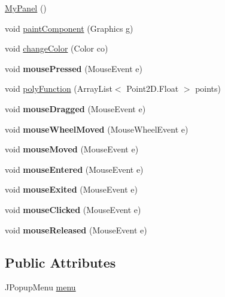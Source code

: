 \begin{DoxyCompactItemize}
\item 
\hyperlink{class_my_panel_a9395d78dbd3ccb9159bcdfd8fa54bf62}{My\+Panel} ()
\item 
void \hyperlink{class_my_panel_a01d8184b14a097e845b1845ddf3e4d7d}{paint\+Component} (Graphics g)
\item 
void \hyperlink{class_my_panel_a081232045c04ce6f009f19b500062c91}{change\+Color} (Color co)
\item 
\mbox{\label{class_my_panel_ad1ac4015693658076ffa37d8d3cc16dc}} 
void {\bfseries mouse\+Pressed} (Mouse\+Event e)
\item 
void \hyperlink{class_my_panel_a5d9496e3a6fcc77da4edb2ead258f286}{poly\+Function} (Array\+List$<$ Point2\+D.\+Float $>$ points)
\item 
\mbox{\label{class_my_panel_a89449fea451e2350cdec8bd638d36344}} 
void {\bfseries mouse\+Dragged} (Mouse\+Event e)
\item 
\mbox{\label{class_my_panel_ad512efaf729c549e397b58498bff6043}} 
void {\bfseries mouse\+Wheel\+Moved} (Mouse\+Wheel\+Event e)
\item 
\mbox{\label{class_my_panel_ae26f94cb4b562a2c26928914de71b76e}} 
void {\bfseries mouse\+Moved} (Mouse\+Event e)
\item 
\mbox{\label{class_my_panel_afaf9c657c61bebb715330371b17b9852}} 
void {\bfseries mouse\+Entered} (Mouse\+Event e)
\item 
\mbox{\label{class_my_panel_a86b4f660c427fa44902e777f26d5ea54}} 
void {\bfseries mouse\+Exited} (Mouse\+Event e)
\item 
\mbox{\label{class_my_panel_a657ce352f2f06f2cf535b08019849bef}} 
void {\bfseries mouse\+Clicked} (Mouse\+Event e)
\item 
\mbox{\label{class_my_panel_a975c43d6d03a6dce44f1791bce757839}} 
void {\bfseries mouse\+Released} (Mouse\+Event e)
\end{DoxyCompactItemize}
\subsection*{Public Attributes}
\begin{DoxyCompactItemize}
\item 
J\+Popup\+Menu \hyperlink{class_my_panel_a5214776606bc8c37c7a8395827a0067b}{menu}
\end{DoxyCompactItemize}
